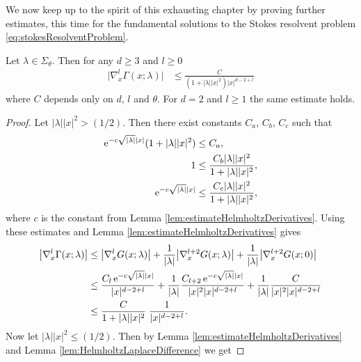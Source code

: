   We now keep up to the spirit of this exhausting chapter by proving further estimates, this time for the fundamental solutions to the Stokes resolvent problem \eqref{eq:stokesResolventProblem}.

\begin{thm}
  \label{thm:fundamentalMatrixEstimate}
  Let $\lambda \in \Sigma_\theta$.
  Then for any $d \geq 3$ and $l \geq 0$
  \begin{align}
    \label{eq:fundamentalMatrixEstimate}
    \big| \nabla_x^l \Gamma(x; \lambda) \big| &\leq \frac{C}{(1 + |\lambda||x|^2) |x|^{d - 2 + l}} 
  \end{align}
    where $C$ depends only on $d$, $l$ and $\theta$. For $d = 2$ and $l \geq 1$ the same estimate holds.
\end{thm}

  \begin{proof}
    Let $|\lambda| |x|^2 > (1/2)$. 
    Then there exist constants $C_a$, $C_b$, $C_c$ such that
    \begin{align*}
      \mathrm{e}^{-c \sqrt{|\lambda|} |x|} ( 1 + |\lambda| |x|^2) &\leq C_a, \\
      1 &\leq \frac{C_b |\lambda| |x|^2}{1 + |\lambda| |x|^2}, \\
      \mathrm{e}^{-c \sqrt{|\lambda|} |x|} &\leq \frac{ C_c |\lambda| |x|^2}{1 + |\lambda| |x|^2},
    \end{align*}
    where $c$ is the constant from Lemma \ref{lem:estimateHelmholtzDerivatives}.
    Using these estimates and Lemma \ref{lem:estimateHelmholtzDerivatives} gives
    \begin{align*}
      \big|\nabla_x^l \Gamma(x; \lambda) \big|
      &\leq \big|\nabla_x^l G(x; \lambda)\big| + \frac{1}{|\lambda|} \big|\nabla_x^{l + 2} G(x; \lambda) \big| + \frac{1}{|\lambda|} \big|\nabla_x^{l + 2} G(x; 0)\big| \\
    &\leq\frac{C_l\, \mathrm{e}^{-c \sqrt{|\lambda|} |x|}}{|x|^{d - 2 + l}} + \frac{1}{|\lambda|} \frac{C_{l + 2}\, \mathrm{e}^{-c \sqrt{|\lambda|} |x|}}{|x|^2 |x|^{d - 2 + l}} + \frac{1}{|\lambda|} \frac{C}{|x|^2 |x|^{d - 2 + l}} \\
    &\leq \frac{C}{1 + |\lambda| |x|^2}\; \frac{1}{|x|^{d - 2 + l}}.
    \end{align*}
    Now let $|\lambda| |x|^2 \leq ({1}/{2})$.
    Then by Lemma \ref{lem:estimateHelmholtzDerivatives} and Lemma \ref{lem:HelmholtzLaplaceDifference} we get

\end{proof}
